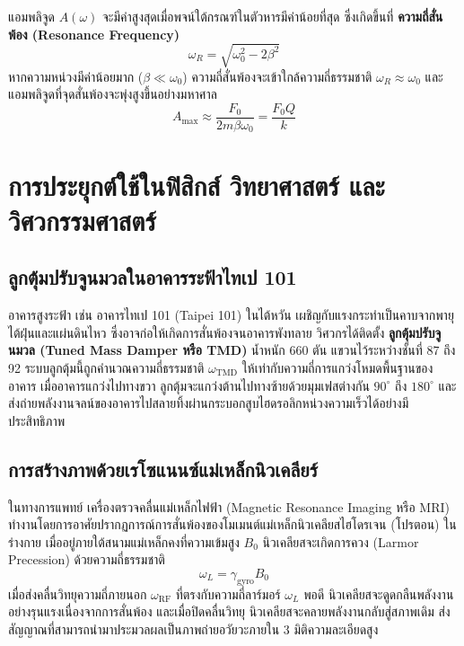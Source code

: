 \begin{maththeorem}[สภาวะการสั่นพ้อง]
แอมพลิจูด $A(\omega)$ จะมีค่าสูงสุดเมื่อพจน์ใต้กรณฑ์ในตัวหารมีค่าน้อยที่สุด ซึ่งเกิดขึ้นที่ \textbf{ความถี่สั่นพ้อง (Resonance Frequency)}
\begin{equation}
\omega_R = \sqrt{\omega_0^2 - 2\beta^2}
\end{equation}
หากความหน่วงมีค่าน้อยมาก ($\beta \ll \omega_0$) ความถี่สั่นพ้องจะเข้าใกล้ความถี่ธรรมชาติ $\omega_R \approx \omega_0$ และแอมพลิจูดที่จุดสั่นพ้องจะพุ่งสูงขึ้นอย่างมหาศาล
\begin{equation}
A_{\text{max}} \approx \frac{F_0}{2m\beta\omega_0} = \frac{F_0 Q}{k}
\end{equation}
\end{maththeorem}

\section{การประยุกต์ใช้ในฟิสิกส์ วิทยาศาสตร์ และวิศวกรรมศาสตร์}
\subsection{ลูกตุ้มปรับจูนมวลในอาคารระฟ้าไทเป 101}
อาคารสูงระฟ้า เช่น อาคารไทเป 101 (Taipei 101) ในไต้หวัน เผชิญกับแรงกระทำเป็นคาบจากพายุไต้ฝุ่นและแผ่นดินไหว ซึ่งอาจก่อให้เกิดการสั่นพ้องจนอาคารพังทลาย วิศวกรได้ติดตั้ง \textbf{ลูกตุ้มปรับจูนมวล (Tuned Mass Damper หรือ TMD)} น้ำหนัก 660 ตัน แขวนไว้ระหว่างชั้นที่ 87 ถึง 92 ระบบลูกตุ้มนี้ถูกคำนวณความถี่ธรรมชาติ $\omega_{\text{TMD}}$ ให้เท่ากับความถี่การแกว่งโหมดพื้นฐานของอาคาร เมื่ออาคารแกว่งไปทางขวา ลูกตุ้มจะแกว่งต้านไปทางซ้ายด้วยมุมเฟสต่างกัน $90^\circ$ ถึง $180^\circ$ และส่งถ่ายพลังงานจลน์ของอาคารไปสลายทิ้งผ่านกระบอกสูบไฮดรอลิกหน่วงความเร็วได้อย่างมีประสิทธิภาพ

\subsection{การสร้างภาพด้วยเรโซแนนซ์แม่เหล็กนิวเคลียร์}
ในทางการแพทย์ เครื่องตรวจคลื่นแม่เหล็กไฟฟ้า (Magnetic Resonance Imaging หรือ MRI) ทำงานโดยการอาศัยปรากฏการณ์การสั่นพ้องของโมเมนต์แม่เหล็กนิวเคลียสไฮโดรเจน (โปรตอน) ในร่างกาย เมื่ออยู่ภายใต้สนามแม่เหล็กคงที่ความเข้มสูง $B_0$ นิวเคลียสจะเกิดการควง (Larmor Precession) ด้วยความถี่ธรรมชาติ
\begin{equation}
\omega_L = \gamma_{\text{gyro}} B_0
\end{equation}
เมื่อส่งคลื่นวิทยุความถี่ภายนอก $\omega_{\text{RF}}$ ที่ตรงกับความถี่ลาร์มอร์ $\omega_L$ พอดี นิวเคลียสจะดูดกลืนพลังงานอย่างรุนแรงเนื่องจากการสั่นพ้อง และเมื่อปิดคลื่นวิทยุ นิวเคลียสจะคลายพลังงานกลับสู่สภาพเดิม ส่งสัญญาณที่สามารถนำมาประมวลผลเป็นภาพถ่ายอวัยวะภายใน 3 มิติความละเอียดสูง


